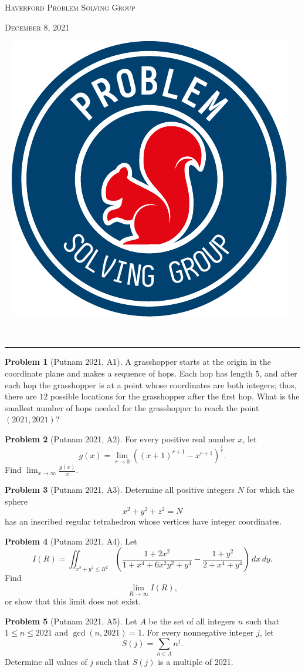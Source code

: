 \documentclass{scrartcl}
\theoremstyle{definition}
\newtheorem*{prob}{Problem}
\begin{document}
\noindent\begin{minipage}{.5\textwidth}{}
	\textsc{Haverford Problem Solving Group}

	\textsc{December 8, 2021}
\end{minipage}\hfill
\begin{minipage}{.4\textwidth}{}
	\ \hfill
	\includegraphics[height = .9in]{psg_logo}
\end{minipage}\\[.5em]
\hrule

\begin{prob}[Putnam 2021, A1]
A grasshopper starts at the origin in the coordinate plane and makes a sequence of hops.
Each hop has length $5$, and after each hop the grasshopper is at a point whose coordinates are both integers; thus, there are $12$ possible locations for the grasshopper after the first hop.
What is the smallest number of hops needed for the grasshopper to reach the point $(2021, 2021)$?

\end{prob}

\begin{prob}[Putnam 2021, A2]
For every positive real number $x$, let
\[
g(x) = \lim_{r \to 0} ((x+1)^{r+1} - x^{r+1})^{\frac{1}{r}}.
\]
Find $\lim_{x \to \infty} \frac{g(x)}{x}$.

\end{prob}

\begin{prob}[Putnam 2021, A3]
Determine all positive integers $N$ for which the sphere
\[
x^2 + y^2 + z^2 = N
\]
has an inscribed regular tetrahedron whose vertices have integer coordinates.

\end{prob}

\begin{prob}[Putnam 2021, A4]
Let
\[
I(R) = \iint_{x^2+y^2 \leq R^2} \left( \frac{1+2x^2}{1+x^4+6x^2y^2+y^4} - \frac{1+y^2}{2+x^4+y^4} \right)\,dx\,dy.
\]
Find
\[
\lim_{R \to \infty} I(R),
\]
or show that this limit does not exist.
 
\end{prob}

\begin{prob}[Putnam 2021, A5]
Let $A$ be the set of all integers $n$ such that $1 \leq n \leq 2021$ and $\gcd(n, 2021) = 1$.
For every nonnegative integer $j$, let
\[
S(j) = \sum_{n \in A} n^j.
\]
Determine all values of $j$ such that $S(j)$ is a multiple of 2021.

\end{prob}
\end{document}
